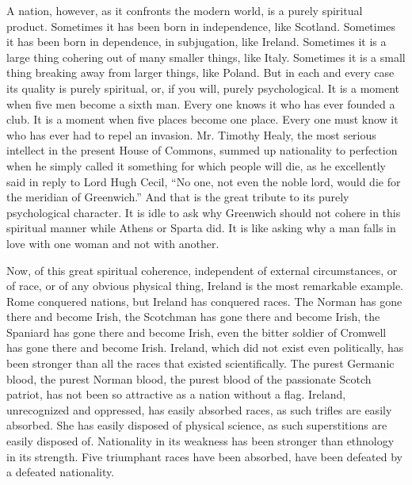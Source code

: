 A nation, however, as it confronts the modern world, is a purely spiritual product. Sometimes it has been born in independence, like Scotland. Sometimes it has been born in dependence, in subjugation, like Ireland. Sometimes it is a large thing cohering out of many smaller things, like Italy. Sometimes it is a small thing breaking away from larger things, like Poland. But in each and every case its quality is purely spiritual, or, if you will, purely psychological. It is a moment when five men become a sixth man. Every one knows it who has ever founded a club. It is a moment when five places become one place. Every one must know it who has ever had to repel an invasion. Mr. Timothy Healy, the most serious intellect in the present House of Commons, summed up nationality to perfection when he simply called it something for which people will die, as he excellently said in reply to Lord Hugh Cecil, “No one, not even the noble lord, would die for the meridian of Greenwich.” And that is the great tribute to its purely psychological character. It is idle to ask why Greenwich should not cohere in this spiritual manner while Athens or Sparta did. It is like asking why a man falls in love with one woman and not with another.

Now, of this great spiritual coherence, independent of external circumstances, or of race, or of any obvious physical thing, Ireland is the most remarkable example. Rome conquered nations, but Ireland has conquered races. The Norman has gone there and become Irish, the Scotchman has gone there and become Irish, the Spaniard has gone there and become Irish, even the bitter soldier of Cromwell has gone there and become Irish. Ireland, which did not exist even politically, has been stronger than all the races that existed scientifically. The purest Germanic blood, the purest Norman blood, the purest blood of the passionate Scotch patriot, has not been so attractive as a nation without a flag. Ireland, unrecognized and oppressed, has easily absorbed races, as such trifles are easily absorbed. She has easily disposed of physical science, as such superstitions are easily disposed of. Nationality in its weakness has been stronger than ethnology in its strength. Five triumphant races have been absorbed, have been defeated by a defeated nationality.

